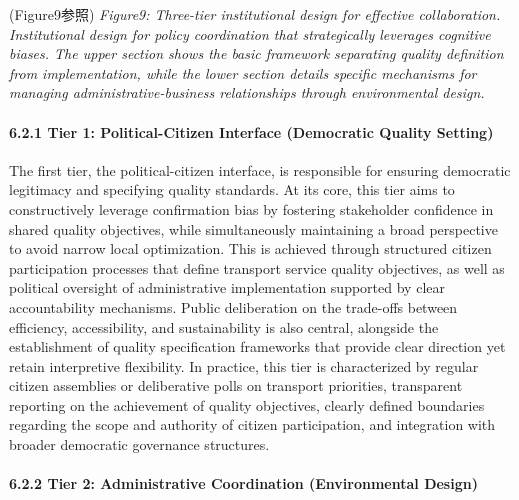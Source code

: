 (Figure9参照) \emph{Figure9: Three-tier institutional design for effective collaboration. Institutional design for policy coordination that strategically leverages cognitive biases. The upper section shows the basic framework separating quality definition from implementation, while the lower section details specific mechanisms for managing administrative-business relationships through environmental design.}

\paragraph{6.2.1 Tier 1: Political-Citizen Interface (Democratic Quality Setting)}\label{tier-1-political-citizen-interface-democratic-quality-setting}

The first tier, the political-citizen interface, is responsible for ensuring democratic legitimacy and specifying quality standards. At its core, this tier aims to constructively leverage confirmation bias by fostering stakeholder confidence in shared quality objectives, while simultaneously maintaining a broad perspective to avoid narrow local optimization. This is achieved through structured citizen participation processes that define transport service quality objectives, as well as political oversight of administrative implementation supported by clear accountability mechanisms. Public deliberation on the trade-offs between efficiency, accessibility, and sustainability is also central, alongside the establishment of quality specification frameworks that provide clear direction yet retain interpretive flexibility. In practice, this tier is characterized by regular citizen assemblies or deliberative polls on transport priorities, transparent reporting on the achievement of quality objectives, clearly defined boundaries regarding the scope and authority of citizen participation, and integration with broader democratic governance structures.

\paragraph{6.2.2 Tier 2: Administrative Coordination (Environmental Design)}\label{tier-2-administrative-coordination-environmental-design}

